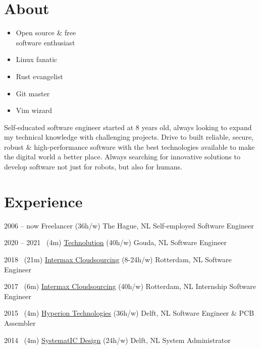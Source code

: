 \documentclass[]{cv-timvisee}
\providecommand{\tightlist}{%
\setlength{\itemsep}{0pt}\setlength{\parskip}{0pt}}
\begin{document}

\section{About}

{\setlength\multicolsep{3pt}%
\begin{multicols}{3}
\begin{itemize}
  \tightlist{}
  \item Open source \& free \\software enthusiast
  \item Linux fanatic
  \item Rust evangelist
  \item Git master
  \item Vim wizard
\end{itemize}
\end{multicols}}

Self-educated software engineer started at 8 years old, always looking to expand
my technical knowledge with challenging projects.
Drive to built reliable, secure, robust \& high-performance software with the
best technologies available to make the digital world a better place.
Always searching for innovative solutions to develop software not just for
robots, but also for humans.


\section{Experience}

\begin{entrylist}

\entry
{2006 -- now}
{Freelancer {\small\normalfont \small(36h/w)}}
{The Hague, NL}
{Self-employed Software Engineer}

\entry
{2020 -- 2021 ~\hfill \small(4m)}
{\href{https://technolution.eu/}{Technolution} {\small\normalfont (40h/w)}}
{Gouda, NL}
{Software Engineer}

\entry
{2018 ~\hfill \small(21m)}
{\href{https://intermax.nl/}{Intermax Cloudsourcing} {\small\normalfont (8-24h/w)}}
{Rotterdam, NL}
{Software Engineer}

\entry
{2017 ~\hfill \small(6m)}
{\href{https://intermax.nl/}{Intermax Cloudsourcing} {\small\normalfont (40h/w)}}
{Rotterdam, NL}
{Internship Software Engineer}

\entry
{2015 ~\hfill \small(4m)}
{\href{https://hyperiontechnologies.nl/}{Hyperion Technologies} {\small\normalfont (36h/w)}}
{Delft, NL}
{Software Engineer \& PCB Assembler}

\entry
{2014 ~\hfill \small(4m)}
{\href{https://systemat-ic.com/}{SystematIC Design} {\small\normalfont (24h/w)}}
{Delft, NL}
{System Administrator}

\end{entrylist}
\end{document}
